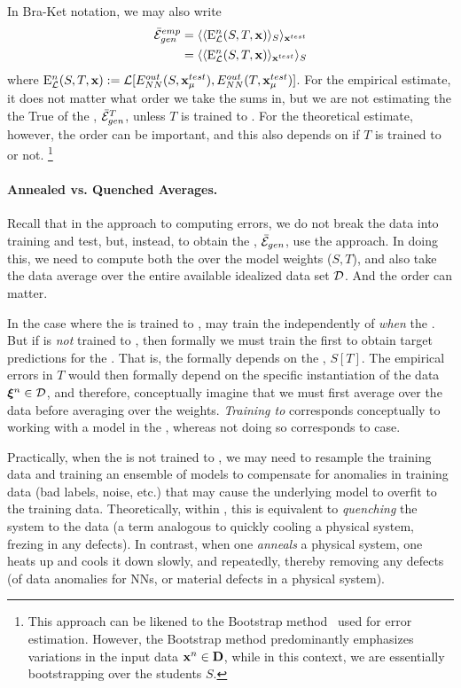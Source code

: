 In Bra-Ket notation, we may also write
\begin{align}
  \bar{\mathcal{E}}^{emp}_{gen}
  &= \langle \langle {\mathrm{E}}^{n}_{\mathcal{L}}(S,T,\mathbf{x}) \rangle_{S} \rangle_{\mathbf{x}^{test}}\\ \nonumber
  &= \langle \langle {\mathrm{E}}^{n}_{\mathcal{L}}(S,T,\mathbf{x}) \rangle_{\mathbf{x}^{test}} \rangle_{S}
\end{align}
where ${\mathrm{E}}^{n}_{\mathcal{L}}(S,T,\mathbf{x}):=\mathcal{L}[E^{out}_{NN}(S,\mathbf{x}_{\mu}^{test}),E^{out}_{NN}(T,\mathbf{x}_{\mu}^{test})]$.
For the empirical estimate, it does not matter what order we take the sums in,
but we are not estimating the
the True \AverageGeneralizationError  of the \Teacher, $\bar{\mathcal{E}}_{gen}^{T}$,
unless $T$ is trained to \Interpolation.
For the theoretical estimate, however, the order can be important, and this also depends on
if $T$ is trained to \Interpolation or not.
\footnote{This approach can be likened to the Bootstrap method~\cite{efron1993bootstrap} used for error estimation.  However, the Bootstrap method predominantly emphasizes variations in the input data $\mathbf{x}^{n}\in\mathbf{D}$, while in this context, we are essentially bootstrapping over the students $S$.}

\paragraph{Annealed vs. Quenched Averages.}
Recall that in the \STATMECH approach to computing errors, we do not break the data into
training and test, but, instead, to obtain the \AverageGeneralizationError, $\bar{\mathcal{E}}_{gen}$, use
the \GeneratingFunction approach. In doing this, we need to compute both the \ThermalAverage
over the model weights ($S,T$), and also take the data average over the entire available idealized data set $\mathcal{D}$.
And the order can matter.

In the case where the \Teacher is trained to \Interpolation, may train the \Student 
independently of \emph{when} the \Teacher.  
But if \Teacher is \emph{not} trained to \Interpolation, then formally we must train the \Teacher
first to obtain target predictions for the \Student.  That is, the \Student formally
depends on the \Teacher, $S[T]$.
The empirical errors in $T$ would then formally depend on the specific instantiation of the data  $\boldsymbol{\xi}^{n}\in\mathcal{D}$,
and therefore, conceptually imagine that we must first average over the data
before averaging over the weights.
\emph{Training to \Interpolation} corresponds conceptually to working with a model
in the \AnnealedApproximation, whereas not doing so corresponds to \Quenched case.

Practically, when the \Teacher is not trained to \Interpolation, 
we may need to resample the training data and training an ensemble of models to compensate for anomalies in training data (bad labels, noise, etc.) that may cause the underlying model to overfit to the training data.
Theoretically, within \SMOG, this is equivalent to \emph{quenching} the system to the data (a term analogous to quickly cooling a physical system, frezing in any defects).
In contrast, when one \emph{anneals} a physical system, one heats up and cools it down slowly, and repeatedly, thereby removing any defects (of data anomalies for NNs, or material defects in a physical system).

